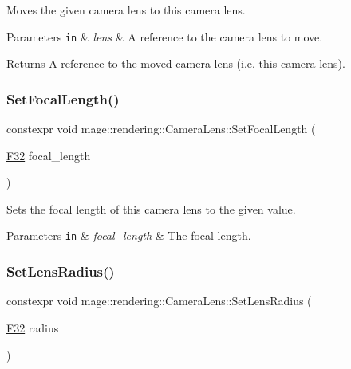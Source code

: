 Moves the given camera lens to this camera lens.


\begin{DoxyParams}[1]{Parameters}
\mbox{\tt in}  & {\em lens} & A reference to the camera lens to move. \\
\hline
\end{DoxyParams}
\begin{DoxyReturn}{Returns}
A reference to the moved camera lens (i.\+e. this camera lens). 
\end{DoxyReturn}
\hypertarget{classmage_1_1rendering_1_1_camera_lens_ad954dd19be6f0cc54c74aecf29bb2134}{}\label{classmage_1_1rendering_1_1_camera_lens_ad954dd19be6f0cc54c74aecf29bb2134} 
\subsubsection{\texorpdfstring{Set\+Focal\+Length()}{SetFocalLength()}}
{\footnotesize\ttfamily constexpr void mage\+::rendering\+::\+Camera\+Lens\+::\+Set\+Focal\+Length (\begin{DoxyParamCaption}\item[{\hyperlink{namespacemage_aa97e833b45f06d60a0a9c4fc22ae02c0}{F32}}]{focal\+\_\+length }\end{DoxyParamCaption})\hspace{0.3cm}{\ttfamily [noexcept]}}

Sets the focal length of this camera lens to the given value.


\begin{DoxyParams}[1]{Parameters}
\mbox{\tt in}  & {\em focal\+\_\+length} & The focal length. \\
\hline
\end{DoxyParams}
\hypertarget{classmage_1_1rendering_1_1_camera_lens_ad7d28ba6b6e462711fb645020697f8ed}{}\label{classmage_1_1rendering_1_1_camera_lens_ad7d28ba6b6e462711fb645020697f8ed} 
\subsubsection{\texorpdfstring{Set\+Lens\+Radius()}{SetLensRadius()}}
{\footnotesize\ttfamily constexpr void mage\+::rendering\+::\+Camera\+Lens\+::\+Set\+Lens\+Radius (\begin{DoxyParamCaption}\item[{\hyperlink{namespacemage_aa97e833b45f06d60a0a9c4fc22ae02c0}{F32}}]{radius }\end{DoxyParamCaption})\hspace{0.3cm}{\ttfamily [noexcept]}}

